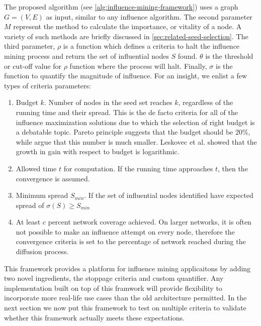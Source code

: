 	The proposed algorithm (see \ref{alg:influence-mining-framework}) uses a graph $G=(V,E)$ as input, similar to any influence algorithm. The second parameter $M$ represent the method to calculate the importance, or vitality of a node. A variety of such methods are briefly discussed in \ref{sec:related-seed-selection}. The third parameter, $\rho$ is a function which defines a criteria to halt the influence mining process and return the set of influential nodes $S$ found. $\theta$ is the threshold or cut-off value for $\rho$ function where the process will halt. Finally, $\sigma$ is the function to quantify the magnitude of influence. For an insight, we enlist a few types of criteria parameters:
		
	\begin{enumerate}
		\item Budget $k$. Number of nodes in the seed set reaches $k$, regardless of the running time and their spread. This is the de facto criteria for all of the influence maximization solutions due to which the selection of right budget is a debatable topic. Pareto principle \cite{pareto1971} suggests that the budget should be 20\%, while \cite{kempe2003} argue that this number is much smaller. Leskovec et al. \cite{leskovec2007b} showed that the growth in gain with respect to budget is logarithmic.
		
		\item Allowed time $t$ for computation. If the running time approaches $t$, then the convergence is assumed.
		
		\item Minimum spread $S_{min}$. If the set of influential nodes identified have expected spread of $\sigma(S)\ge S_{min}$
		
		\item At least $c$ percent network coverage achieved. On larger networks, it is often not possible to make an influence attempt on every node, therefore the convergence criteria is set to the percentage of network reached during the diffusion process.	
	\end{enumerate}

	This framework provides a platform for influence mining applicaitons by adding two novel ingredients, the stoppage criteria and custom quantifier. Any implementation built on top of this framwork will provide flexibility to incorporate more real-life use cases than the old architecture permitted. In the next section we now put this framework to test on multiple criteria to validate whether this framework actually meets these expectations.


